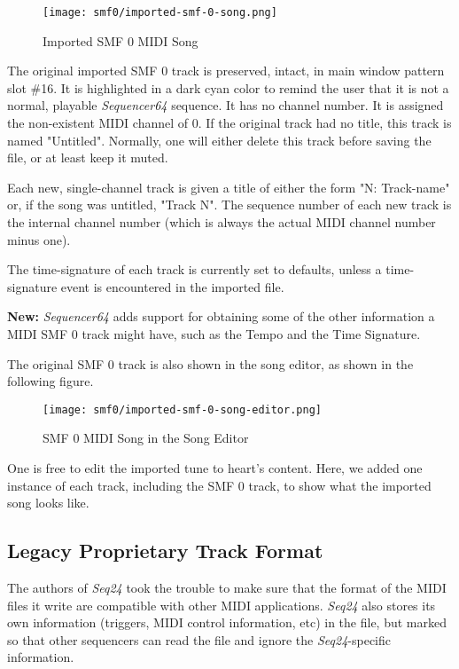 \begin{figure}[H]
   \centering 
   \texttt{[image: smf0/imported-smf-0-song.png]}
   \caption{Imported SMF 0 MIDI Song}
   \label{fig:imported_smf_0_song}
\end{figure}

   The original imported SMF 0 track is preserved, intact, in main window
   pattern slot \#16.  It is highlighted in a dark cyan color to remind the
   user that it is not a normal, playable \textsl{Sequencer64} 
   sequence.  It has no channel number.  It is
   assigned the non-existent MIDI channel of 0.  If the original track had no
   title, this track is named "Untitled".  Normally, one will either delete
   this track before saving the file, or at least keep it muted.

   Each new, single-channel track is given a title of either the form
   "N: Track-name" or, if the song was untitled, "Track N".
   The sequence number of each new track is the internal channel number (which
   is always the actual MIDI channel number minus one).

   The time-signature of each track is currently set to defaults, unless a
   time-signature event is encountered in the imported file.

   \textbf{New:}
   \textsl{Sequencer64} adds support for obtaining some of the other
   information a MIDI SMF 0 track might have, such as the Tempo and the
   Time Signature.

   The original SMF 0 track is also shown in the song editor, as shown in the
   following figure.

\begin{figure}[H]
   \centering 
   \texttt{[image: smf0/imported-smf-0-song-editor.png]}
   \caption{SMF 0 MIDI Song in the Song Editor}
   \label{fig:imported_smf_0_song_editor}
\end{figure}

   One is free to edit the imported tune to heart's content.
   Here, we added one instance of each track, including the SMF 0 track,
   to show what the imported song looks like.

\subsection{Legacy Proprietary Track Format}
\label{subsec:legacy_midi_format}

   The authors of \textsl{Seq24} took the trouble to make sure that the format
   of the MIDI files it write are compatible with other MIDI applications.
   \textsl{Seq24} also stores its own information (triggers, MIDI control
   information, etc) in the file, but marked so that other sequencers can read
   the file and ignore the \textsl{Seq24}-specific information.

